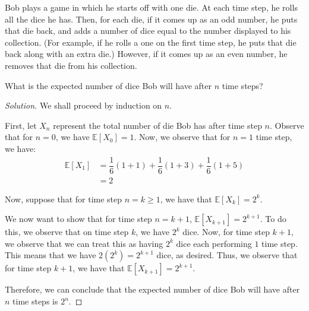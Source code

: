 \documentclass{article}
\newenvironment{solution}{\begin{proof}[Solution]}{\end{proof}}
\newcommand{\E}{\mathbb{E}}
\begin{document}
\begin{hw}
	Bob plays a game in which he starts off with one die. At each time step, he rolls all the dice he has. Then, for each die, if it comes up as an odd number, he puts that die back, and adds a number of dice equal to the number displayed to his collection. (For example, if he rolls a one on the first time step, he puts that die back along with an extra die.) However, if it comes up as an even number, he removes that die from his collection.
	
	What is the expected number of dice Bob will have after $n$ time steps?
\end{hw}
\begin{solution}
	We shall proceed by induction on $n$.
	
	First, let $X_{n}$ represent the total number of die Bob has after time step $n$. Observe that for $n = 0$, we have $\E[X_{0}] = 1$. Now, we observe that for $n=1$ time step, we have:
	\begin{align*}
		\E[X_{1}] &= \dfrac{1}{6}(1+1) + \dfrac{1}{6}(1+3) + \dfrac{1}{6}(1+5) \\
		&= 2
	\end{align*}

	Now, suppose that for time step $n = k \geq 1$, we have that $\E[X_{k}] = 2^{k}$.
	
	We now want to show that for time step $n=k+1$, $\E[X_{k+1}] = 2^{k+1}$. To do this, we observe that on time step $k$, we have $2^{k}$ dice. Now, for time step $k+1$, we observe that we can treat this as having $2^{k}$ dice each performing $1$ time step. This means that we have $2(2^{k}) = 2^{k+1}$ dice, as desired. Thus, we observe that for time step $k+1$, we have that $\E[X_{k+1}] = 2^{k+1}$.
	
	Therefore, we can conclude that the expected number of dice Bob will have after $n$ time steps is $2^{n}$.
\end{solution}
\end{document}
